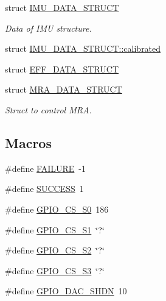 \begin{DoxyCompactItemize}
struct \hyperlink{structIMU__DATA__STRUCT}{I\-M\-U\-\_\-\-D\-A\-T\-A\-\_\-\-S\-T\-R\-U\-C\-T}
\begin{DoxyCompactList}\small\item\em Data of I\-M\-U structure. \end{DoxyCompactList}\item 
struct \hyperlink{structIMU__DATA__STRUCT_1_1calibrated}{I\-M\-U\-\_\-\-D\-A\-T\-A\-\_\-\-S\-T\-R\-U\-C\-T\-::calibrated}
\item 
struct \hyperlink{structEFF__DATA__STRUCT}{E\-F\-F\-\_\-\-D\-A\-T\-A\-\_\-\-S\-T\-R\-U\-C\-T}
\item 
struct \hyperlink{structMRA__DATA__STRUCT}{M\-R\-A\-\_\-\-D\-A\-T\-A\-\_\-\-S\-T\-R\-U\-C\-T}
\begin{DoxyCompactList}\small\item\em Struct to control M\-R\-A. \end{DoxyCompactList}\end{DoxyCompactItemize}
\subsection*{Macros}
\begin{DoxyCompactItemize}
\item 
\#define \hyperlink{communication_01_07C_xC3_xB3pia_01em_01conflito_01de_01Caio_01Gustavo_01Mesquita_01Angelo_012013-04-28_08_8h_a6d58f9ac447476b4e084d7ca383f5183}{F\-A\-I\-L\-U\-R\-E}~-\/1
\item 
\#define \hyperlink{communication_01_07C_xC3_xB3pia_01em_01conflito_01de_01Caio_01Gustavo_01Mesquita_01Angelo_012013-04-28_08_8h_aa90cac659d18e8ef6294c7ae337f6b58}{S\-U\-C\-C\-E\-S\-S}~1
\item 
\#define \hyperlink{communication_01_07C_xC3_xB3pia_01em_01conflito_01de_01Caio_01Gustavo_01Mesquita_01Angelo_012013-04-28_08_8h_a48ea000c2b251ce26ea35d300f319651}{G\-P\-I\-O\-\_\-\-C\-S\-\_\-\-S0}~186
\item 
\#define \hyperlink{communication_01_07C_xC3_xB3pia_01em_01conflito_01de_01Caio_01Gustavo_01Mesquita_01Angelo_012013-04-28_08_8h_a7672ba13ff6f297c347790586c9a02e0}{G\-P\-I\-O\-\_\-\-C\-S\-\_\-\-S1}~\char`\"{}?\char`\"{}
\item 
\#define \hyperlink{communication_01_07C_xC3_xB3pia_01em_01conflito_01de_01Caio_01Gustavo_01Mesquita_01Angelo_012013-04-28_08_8h_a94b6d57532d1db55dc4efd9fb234f156}{G\-P\-I\-O\-\_\-\-C\-S\-\_\-\-S2}~\char`\"{}?\char`\"{}
\item 
\#define \hyperlink{communication_01_07C_xC3_xB3pia_01em_01conflito_01de_01Caio_01Gustavo_01Mesquita_01Angelo_012013-04-28_08_8h_ad774f00fc71216488e24a803bf4eb6aa}{G\-P\-I\-O\-\_\-\-C\-S\-\_\-\-S3}~\char`\"{}?\char`\"{}
\item 
\#define \hyperlink{communication_01_07C_xC3_xB3pia_01em_01conflito_01de_01Caio_01Gustavo_01Mesquita_01Angelo_012013-04-28_08_8h_a99fc26a9596a1cb1f0f9936dbb8ccca6}{G\-P\-I\-O\-\_\-\-D\-A\-C\-\_\-\-S\-H\-D\-N}~10
\end{DoxyCompactItemize}
